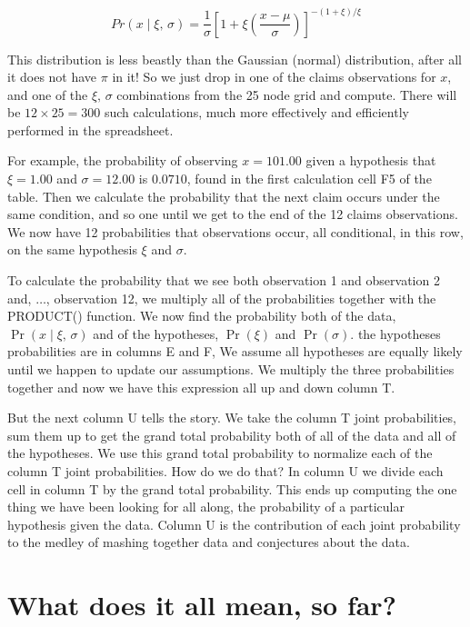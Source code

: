 \documentclass[
]{book}
\begin{document}
\[
Pr( x \mid \xi, \, \sigma) = \frac{1}{\sigma} \left[1+\xi\left(\frac{x-\mu}{\sigma}\right) \right]^{-(1+\xi)/\xi}
\]

This distribution is less beastly than the Gaussian (normal) distribution, after all it does not have \(\pi\) in it! So we just drop in one of the claims observations for \(x\), and one of the \(\xi,\,\sigma\) combinations from the 25 node grid and compute. There will be \(12 \times 25 = 300\) such calculations, much more effectively and efficiently performed in the spreadsheet.

For example, the probability of observing \(x=101.00\) given a hypothesis that \(\xi=1.00\) and \(\sigma=12.00\) is \(0.0710\), found in the first calculation cell F5 of the table. Then we calculate the probability that the next claim occurs under the same condition, and so one until we get to the end of the 12 claims observations. We now have 12 probabilities that observations occur, all conditional, in this row, on the same hypothesis \(\xi\) and \(\sigma\).

To calculate the probability that we see both observation 1 and observation 2 and, \(\ldots\), observation 12, we multiply all of the probabilities together with the PRODUCT() function. We now find the probability both of the data, \(\operatorname{Pr}( x \mid \xi, \, \sigma)\) and of the hypotheses, \(\operatorname{Pr}(\xi)\) and \(\operatorname{Pr}(\sigma)\). the hypotheses probabilities are in columns E and F, We assume all hypotheses are equally likely until we happen to update our assumptions. We multiply the three probabilities together and now we have this expression all up and down column T.

But the next column U tells the story. We take the column T joint probabilities, sum them up to get the grand total probability both of all of the data and all of the hypotheses. We use this grand total probability to normalize each of the column T joint probabilities. How do we do that? In column U we divide each cell in column T by the grand total probability. This ends up computing the one thing we have been looking for all along, the probability of a particular hypothesis given the data. Column U is the contribution of each joint probability to the medley of mashing together data and conjectures about the data.

\hypertarget{what-does-it-all-mean-so-far}{%
\section{What does it all mean, so far?}\label{what-does-it-all-mean-so-far}}
\end{document}

